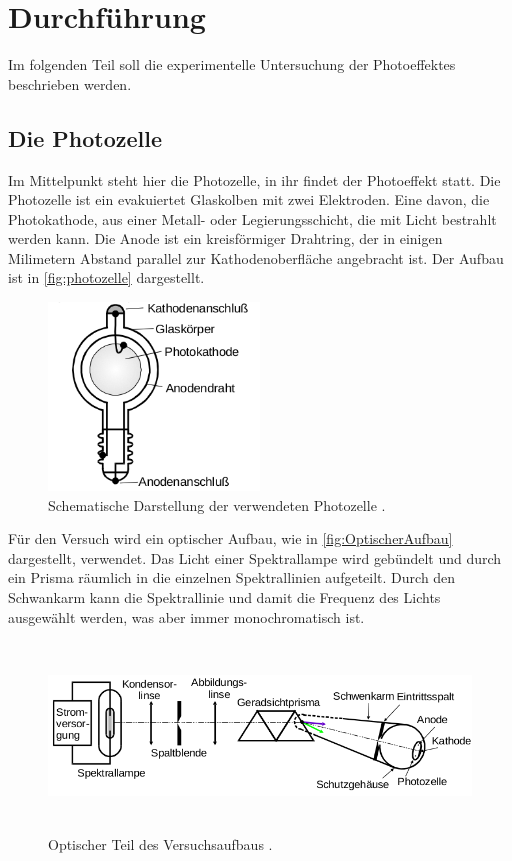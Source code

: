 \section{Durchführung}
\label{sec:Durchführung}

Im folgenden Teil soll die experimentelle Untersuchung der Photoeffektes beschrieben
werden.

\subsection{Die Photozelle}
\label{sec:Die Photozelle}
Im Mittelpunkt steht hier die Photozelle, in ihr findet der Photoeffekt statt. Die
Photozelle ist ein evakuiertet Glaskolben mit zwei Elektroden. Eine davon, die
Photokathode, aus einer Metall- oder Legierungsschicht, die mit Licht bestrahlt werden
kann. Die Anode ist ein kreisförmiger Drahtring, der in einigen Milimetern Abstand
parallel zur Kathodenoberfläche angebracht ist. Der Aufbau ist in \autoref{fig:photozelle}
dargestellt.
\begin{figure}
	\centering
	\includegraphics[height=5cm]{pictures/photozelle.png}
	\caption{Schematische Darstellung der verwendeten Photozelle \cite{anleitung}.}
	\label{fig:photozelle}
\end{figure}

Für den Versuch wird ein optischer Aufbau, wie in \autoref{fig:OptischerAufbau}
dargestellt, verwendet. Das Licht einer Spektrallampe wird gebündelt und durch ein Prisma
räumlich in die einzelnen Spektrallinien aufgeteilt. Durch den Schwankarm kann die
Spektrallinie und damit die Frequenz des Lichts ausgewählt werden, was aber immer
monochromatisch ist.

\begin{figure}
	\centering
	\includegraphics[height=5cm]{pictures/OptischerAufbau.png}
	\caption{Optischer Teil des Versuchsaufbaus \cite{anleitung}.}
	\label{fig:OptischerAufbau}
\end{figure}

